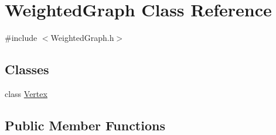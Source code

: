 \hypertarget{class_weighted_graph}{}\section{Weighted\+Graph Class Reference}
\label{class_weighted_graph}


{\ttfamily \#include $<$Weighted\+Graph.\+h$>$}

\subsection*{Classes}
\begin{DoxyCompactItemize}
\item 
class \hyperlink{class_weighted_graph_1_1_vertex}{Vertex}
\end{DoxyCompactItemize}
\subsection*{Public Member Functions}

